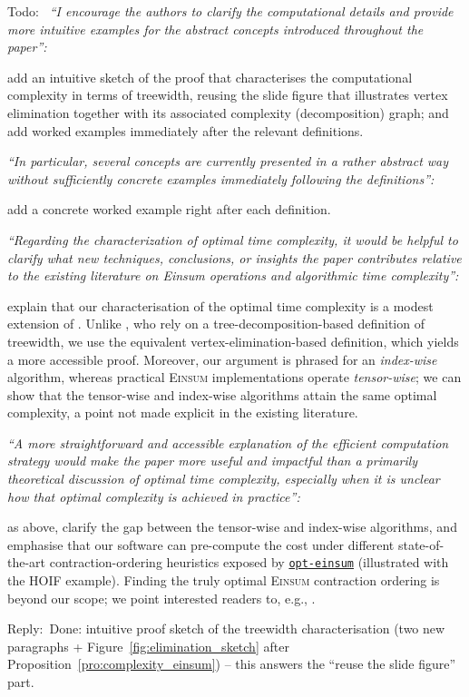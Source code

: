 \documentclass[12pt]{article}
\newenvironment{reply}{\par\smallskip\noindent\color{blue}Reply:\ \ignorespaces}{\par}
\newenvironment{todo}{\par\smallskip\noindent\color{red}Todo:\ \ignorespaces}{\par}
\newcommand{\libref}[2]{\href{#2}{\texttt{#1}}}
\theoremstyle{plain}
\theoremstyle{definition}
\def\Einsum{\textsc{Einsum}}
\newcommand{\opteinsum}{\libref{opt-einsum}{https://dgasmith.github.io/opt_einsum/}}
\begin{document}
\begin{todo}
\emph{``I encourage the authors to clarify the computational details and provide
more intuitive examples for the abstract concepts introduced throughout the
paper'':} 

add an intuitive sketch of the proof that characterises the
computational complexity in terms of treewidth, reusing the slide figure that
illustrates vertex elimination together with its associated complexity
(decomposition) graph; and add worked examples immediately after the relevant
definitions.

\emph{``In particular, several concepts are currently presented in a rather
abstract way without sufficiently concrete examples immediately following the
definitions'':} 

add a concrete worked example right after each definition.

\emph{``Regarding the characterization of optimal time complexity, it would be
helpful to clarify what new techniques, conclusions, or insights the paper
contributes relative to the existing literature on Einsum operations and
algorithmic time complexity'':}

explain that our characterisation of the optimal
time complexity is a modest extension of \citet{markov2008simulating}. Unlike
\citet{markov2008simulating}, who rely on a tree-decomposition-based definition
of treewidth, we use the equivalent vertex-elimination-based definition, which
yields a more accessible proof. Moreover, our argument is phrased
for an \emph{index-wise} algorithm, whereas practical \Einsum{} implementations
operate \emph{tensor-wise}; we can show that the tensor-wise and index-wise
algorithms attain the same optimal complexity, a point not made explicit in the
existing literature.

\emph{``A more straightforward and accessible explanation of the efficient
computation strategy would make the paper more useful and impactful than a
primarily theoretical discussion of optimal time complexity, especially when it
is unclear how that optimal complexity is achieved in practice'':} 

as above,
clarify the gap between the tensor-wise and index-wise algorithms, and emphasise
that our software can pre-compute the cost under different state-of-the-art
contraction-ordering heuristics exposed by \opteinsum{} (illustrated with the
HOIF example). Finding the truly optimal \Einsum{} contraction ordering is beyond
our scope; we point interested readers to, e.g., \citet{gray2021hyper}.
\end{todo}
\begin{reply}
[PARTIAL] Done: intuitive proof sketch of the treewidth characterisation
  (two new paragraphs + Figure~\ref{fig:elimination_sketch} after
  Proposition~\ref{pro:complexity_einsum}) -- this answers the ``reuse the
  slide figure'' part.
\end{reply}
\end{document}
